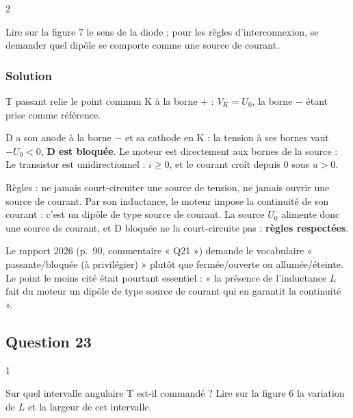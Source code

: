 \documentclass[11pt,a4paper]{article}
\newcommand{\equationajustee}[1]{%
  \sbox{\boiteequation}{$\displaystyle #1$}%
  \ifdim\wd\boiteequation>\linewidth
    \[\resizebox{\linewidth}{!}{\usebox{\boiteequation}}\]%
  \else
    \[#1\]%
  \fi}
\begin{document}
\begin{indication}{2}

Lire sur la figure 7 le sens de la diode ; pour les règles d'interconnexion, se demander quel dipôle se comporte comme une source de courant.

\end{indication}

\hypertarget{solution-21}{%
\subsubsection{Solution}\label{solution-21}}

T passant relie le point commun K à la borne \(+\) : \(V_K=U_0\), la borne \(-\) étant prise comme référence.

D a son anode à la borne \(-\) et sa cathode en K : la tension à ses bornes vaut \(-U_0<0\), \textbf{D est bloquée}. Le moteur est directement aux bornes de la source :
\equationajustee{\boxed{u=U_0}}
Le transistor est unidirectionnel : \textbf{\(i\ge0\)}, et le courant croît depuis \(0\) sous \(u>0\).

Règles : ne jamais court-circuiter une source de tension, ne jamais ouvrir une source de courant. Par son inductance, le moteur impose la continuité de son courant : c'est un dipôle de type source de courant. La source \(U_0\) alimente donc une source de courant, et D bloquée ne la court-circuite pas : \textbf{règles respectées}.

\begin{jury}

Le rapport 2026 (p.~90, commentaire « Q21 ») demande le vocabulaire « passante/bloquée (à privilégier) » plutôt que fermée/ouverte ou allumée/éteinte. Le point le moins cité était pourtant essentiel : « la présence de l'inductance \(L\) fait du moteur un dipôle de type source de courant qui en garantit la continuité ».

\end{jury}

\hypertarget{question-23}{%
\subsection{Question 23}\label{question-23}}

\begin{indication}{1}

Sur quel intervalle angulaire T est-il commandé ? Lire sur la figure 6 la variation de \(L\) et la largeur de cet intervalle.

\end{indication}
\end{document}
